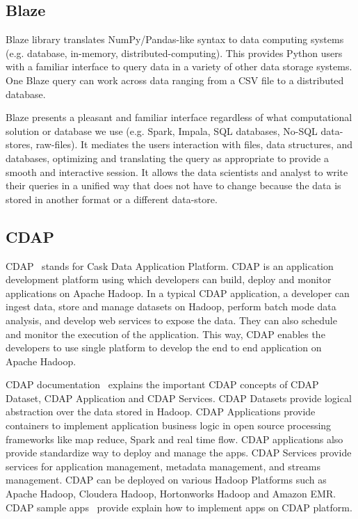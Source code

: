 \subsection{Blaze \cv}

     Blaze library translates NumPy/Pandas-like syntax to data
     computing systems (e.g. database, in-memory,
     distributed-computing). This provides Python users with a
     familiar interface to query data in a variety of other data
     storage systems.  One Blaze query can work across data ranging
     from a CSV file to a distributed database.

     Blaze presents a pleasant and familiar interface regardless of
     what computational solution or database we use (e.g. Spark,
     Impala, SQL databases, No-SQL data-stores, raw-files). It
     mediates the users interaction with files, data structures, and
     databases, optimizing and translating the query as appropriate to
     provide a smooth and interactive session. It allows the data
     scientists and analyst to write their queries in a unified way
     that does not have to change because the data is stored in
     another format or a different data-store.~\cite{www-blaze}

\subsection{CDAP \cv}

CDAP~\cite{www-cdap} stands for Cask Data Application Platform. CDAP
is an application development platform using which developers can
build, deploy and monitor applications on Apache Hadoop. In a typical
CDAP application, a developer can ingest data, store and manage
datasets on Hadoop, perform batch mode data analysis, and develop web
services to expose the data.  They can also schedule and monitor the
execution of the application. This way, CDAP enables the developers to
use single platform to develop the end to end application on Apache
Hadoop.

CDAP documentation~\cite{www-cdap-docs} explains the important CDAP
concepts of CDAP Dataset, CDAP Application and CDAP Services. CDAP
Datasets provide logical abstraction over the data stored in
Hadoop. CDAP Applications provide containers to implement application
business logic in open source processing frameworks like map reduce,
Spark and real time flow. CDAP applications also provide standardize
way to deploy and manage the apps. CDAP Services provide services for
application management, metadata management, and streams management.
CDAP can be deployed on various Hadoop Platforms such as Apache
Hadoop, Cloudera Hadoop, Hortonworks Hadoop and Amazon EMR.  CDAP
sample apps~\cite{github-cdap-sample-apps} provide explain how to
implement apps on CDAP platform.

